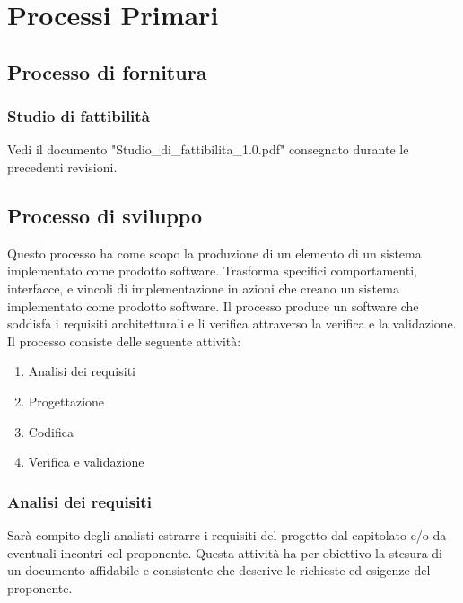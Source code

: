 \documentclass[a4paper,11pt]{article}
\begin{document}
	\newpage
	\section{Processi Primari}
	\subsection{Processo di fornitura}
		\subsubsection{Studio di fattibilità}	
	Vedi il documento "Studio\_di\_fattibilita\_1.0.pdf" consegnato durante le precedenti revisioni.
	
		\subsection{Processo di sviluppo}	
		Questo processo ha come scopo la produzione di un elemento di un sistema implementato come prodotto software. Trasforma specifici comportamenti, interfacce, e vincoli di implementazione in azioni che creano un sistema implementato come prodotto software. Il processo produce un software che soddisfa i requisiti architetturali e li verifica attraverso la	verifica e la validazione.	
		Il processo consiste delle seguente attività:
			\begin{enumerate}
				\item Analisi dei requisiti
				\item Progettazione
				\item Codifica
				\item Verifica e validazione
			\end{enumerate}
		\subsubsection{Analisi dei requisiti}
		Sarà compito degli analisti estrarre i requisiti del progetto dal capitolato e/o da eventuali incontri col proponente. Questa attività ha per obiettivo la stesura di un documento affidabile e consistente che descrive le richieste ed esigenze del proponente.
\end{document}
